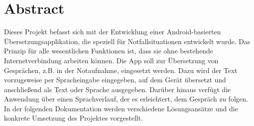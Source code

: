 \newpage
\section*{Abstract}\label{sec:abstract}

Dieses Projekt befasst sich mit der Entwicklung einer Android-basierten Über\-setzungs\-appli\-kation, die speziell für Notfallsituationen entwickelt wurde. Das Prinzip für alle wesentlichen Funktionen ist, dass sie ohne bestehende Internetverbindung arbeiten können. Die App soll zur Übersetzung von Gesprächen, z.B. in der Notaufnahme, eingesetzt werden. Dazu wird der Text vorzugsweise per Spracheingabe eingegeben, auf dem Gerät übersetzt und anschließend als Text oder Sprache ausgegeben. Darüber hinaus verfügt die Anwendung über einen Sprachverlauf, der es erleichtert, dem Gespräch zu folgen. In der folgenden Dokumentation werden verschiedene Lösungsansätze und die konkrete Umsetzung des Projektes vorgestellt.